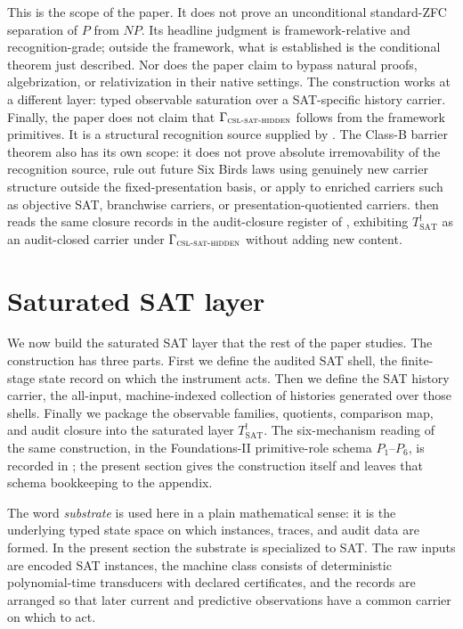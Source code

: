 \documentclass[11pt]{article}
\newcommand{\Tsat}{T^{!}_{\mathrm{SAT}}}
\newcommand{\CSLSATHidden}{\Gamma_{\textsc{csl-sat-hidden}}}
\theoremstyle{definition}
\begin{document}
This is the scope of the paper.  It does not prove an unconditional
standard-ZFC separation of \(P\) from \(NP\).  Its headline judgment is
framework-relative and recognition-grade; outside the framework, what
is established is the conditional theorem just described.  Nor does
the paper claim to bypass natural proofs, algebrization, or
relativization in their native settings.  The construction works at a
different layer: typed observable saturation over a SAT-specific
history carrier.  Finally, the paper does not claim that
\(\CSLSATHidden\) follows from the framework primitives.  It is a
structural recognition source supplied by \citet{TsiokosHiddenness2026}.
The Class-B barrier theorem
also has its own scope: it does not prove absolute irremovability of the
recognition source, rule out future Six Birds laws using genuinely new
carrier structure outside the fixed-presentation basis, or apply to
enriched carriers such as objective SAT, branchwise carriers, or
presentation-quotiented carriers.   then
reads the same closure records in the audit-closure register of
\citet{Tsiokos2026AOR}, exhibiting \(\Tsat\) as an audit-closed carrier
under \(\CSLSATHidden\) without adding new content.
 

\section{Saturated SAT layer}
\label{sec:saturated-closure}

We now build the saturated SAT layer that the rest of the paper
studies.  The construction has three parts.  First we define the
audited SAT shell, the finite-stage state record on which the
instrument acts.  Then we define the SAT history carrier, the
all-input, machine-indexed collection of histories generated over
those shells.  Finally we package the observable families, quotients,
comparison map, and audit closure into the saturated layer
\(\Tsat\).  The six-mechanism reading of the same construction, in
the Foundations-II primitive-role schema \(P_{1}\)--\(P_{6}\), is
recorded in ; the present section gives the
construction itself and leaves that schema bookkeeping to the
appendix.

The word \emph{substrate} is used here in a plain mathematical sense:
it is the underlying typed state space on which instances, traces, and
audit data are formed.  In the present section the substrate is
specialized to SAT.  The raw inputs are encoded SAT instances, the
machine class consists of deterministic polynomial-time transducers
with declared certificates, and the records are arranged so that later
current and predictive observations have a common carrier on which to
act.
\end{document}
